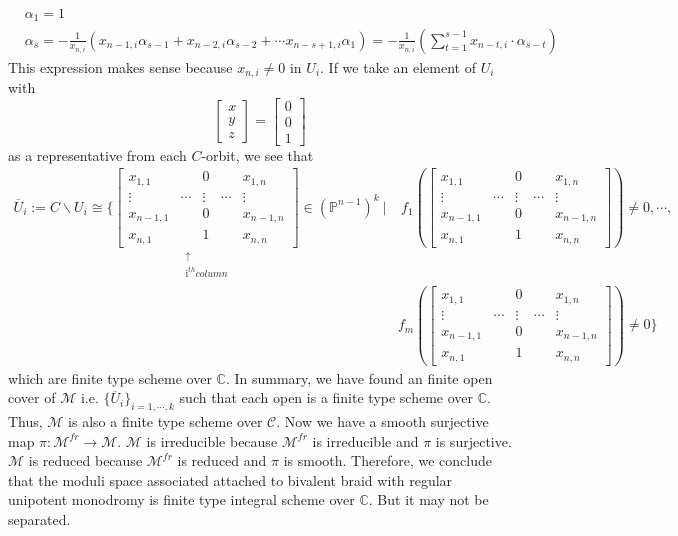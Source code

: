 \begin{example}
	\begin{align*}
		&\alpha_1=1\\
		&\alpha_s=-\frac{1}{x_{n,i}}(x_{n-1,i}\alpha_{s-1}+x_{n-2,i}\alpha_{s-2}+\cdots x_{n-s+1,i}\alpha_{1})
		=-\frac{1}{x_{n,i}}(\sum_{t=1}^{s-1} x_{n-t,i}\cdot\alpha_{s-t} )
	\end{align*}
This expression makes sense because $x_{n,i}\neq 0$ in $U_i$.
If we take an element of $U_i$ with 
\[
	\begin{bmatrix}
		x\\
		y\\
		z
	\end{bmatrix}
	=
	\begin{bmatrix}
		0\\
		0\\
		1
	\end{bmatrix}	
\]
as a representative from each $C$-orbit, we see that 
\begin{align*}
	\overline{U}_i
	:= C\backslash U_i\cong
	\{
	\underset{\substack{\uparrow \\ \text{i}^{th} column}}
	{\begin{bmatrix}
		x_{1,1}&&0 &&x_{1,n}\\
		\vdots&\cdots&\vdots&\cdots&\vdots\\
		x_{n-1,1}&&0&&x_{n-1,n}\\
		x_{n,1}&&1&&x_{n,n}
	\end{bmatrix}}
	\in (\mathbb{P}^{n-1})^k~|
	&~	
	f_1(\begin{bmatrix}
		x_{1,1}&&0 &&x_{1,n}\\
		\vdots&\cdots&\vdots&\cdots&\vdots\\
		x_{n-1,1}&&0&&x_{n-1,n}\\
		x_{n,1}&&1&&x_{n,n}
	\end{bmatrix})\neq0,
	\cdots,\\
	& 
	f_m(\begin{bmatrix}
		x_{1,1}&&0 &&x_{1,n}\\
		\vdots&\cdots&\vdots&\cdots&\vdots\\
		x_{n-1,1}&&0&&x_{n-1,n}\\
		x_{n,1}&&1&&x_{n,n}
	\end{bmatrix})\neq 0\}	
\end{align*}
which are finite type scheme over $\mathbb{C}$. In summary, we have found an finite open cover of $\mathcal{M}$ i.e. $\{\overline{U}_i\}_{i=1,\cdots,k}$ such that each open is a finite type scheme over $\mathbb{C}$. Thus, $\mathcal{M}$ is also a finite type scheme over $\mathcal{C}$. Now we have a smooth surjective map $\pi : \mathcal{M}^{fr}\rightarrow \mathcal{M}$. $\mathcal{M}$ is irreducible because $\mathcal{M}^{fr}$ is irreducible and $\pi$ is surjective. $\mathcal{M}$ is reduced because $\mathcal{M}^{fr}$ is reduced and $\pi$ is smooth. Therefore, we conclude that the moduli space associated attached to bivalent braid with regular unipotent monodromy is finite type integral scheme over $\mathbb{C}$. But it may not be separated.
\end{example}
